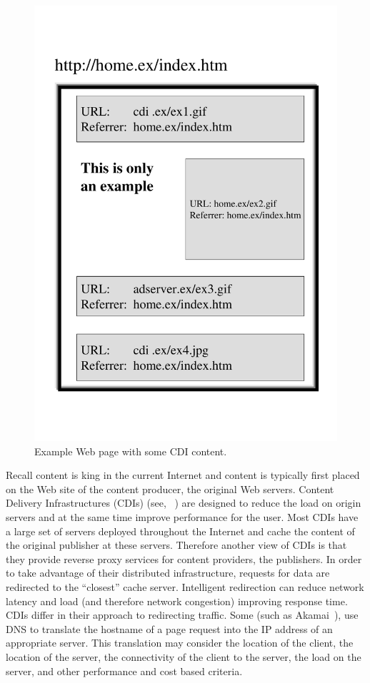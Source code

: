 \begin{figure} 
\begin{center}
\includegraphics[width=0.6\linewidth]{figures-pdf/page}
\vspace*{-.7cm}
\end{center}
\caption{Example Web page with some CDI content.}
\label{fig:aka:cdn_page}
\end{figure}

Recall content is king in the current Internet and content is typically first
placed on the Web site of the content producer, the original Web servers.
Content Delivery Infrastructures (CDIs) (see,
\eg~\cite{cdn:2002,akamai:2002,gadde01web,bent02whole,johnson00measured,bala:imw01,gribble:osdi02})
are designed to reduce the load on origin servers and at the same time improve
performance for the user.  Most CDIs have a large set of servers deployed
throughout the Internet and cache the content of the original publisher at
these servers.  Therefore another view of CDIs is that they provide reverse
proxy services for content providers, the publishers.  In order to take
advantage of their distributed infrastructure, requests for data are redirected
to the ``closest'' cache server. Intelligent redirection can reduce network
latency and load (and therefore network congestion) improving response time.
CDIs differ in their approach to redirecting traffic. Some (such as
Akamai~\cite{Akamai-Network}), use DNS to translate the hostname of a page
request into the IP address of an appropriate server. This translation may
consider the location of the client, the location of the server, the
connectivity of the client to the server, the load on the server, and other
performance and cost based criteria.

